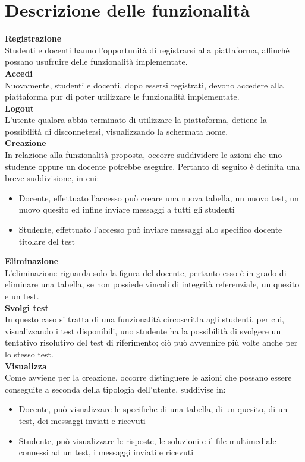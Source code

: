 \documentclass{article}
\begin{document}
\section{Descrizione delle funzionalità}
\large
\textbf{Registrazione}\\
Studenti e docenti hanno l'opportunità di registrarsi alla piattaforma, affinchè possano usufruire delle funzionalità implementate.\vspace*{7pt}\\
\textbf{Accedi}\\
Nuovamente, studenti e docenti, dopo essersi registrati, devono accedere alla piattaforma pur di poter utilizzare le funzionalità implementate.\vspace*{7pt}\\
\textbf{Logout}\\
L'utente qualora abbia terminato di utilizzare la piattaforma, detiene la possibilità di disconnetersi, visualizzando la schermata home.\vspace*{7pt}\\
\textbf{Creazione}\\
In relazione alla funzionalità proposta, occorre suddividere le azioni che uno studente oppure un docente potrebbe eseguire. Pertanto di seguito è definita una breve suddivisione, in cui: 
\begin{itemize}[label={-}]
    \itemsep0em
    \item Docente, effettuato l'accesso può creare una nuova tabella, un nuovo test, un nuovo quesito ed infine inviare messaggi a tutti gli studenti
    \item Studente, effettuato l'accesso può inviare messaggi allo specifico docente titolare del test
\end{itemize}    
\textbf{Eliminazione}\\
L'eliminazione riguarda solo la figura del docente, pertanto esso è in grado di eliminare una tabella, se non possiede vincoli di integrità referenziale, un quesito e un test.\vspace*{7pt}\\
\textbf{Svolgi test}\\
In questo caso si tratta di una funzionalità circoscritta agli studenti, per cui, visualizzando i test disponibili, uno studente ha la possibilità di svolgere un tentativo risolutivo del test di riferimento; ciò può avvennire più volte anche per lo stesso test.\vspace*{7pt}\\
\textbf{Visualizza}\\
Come avviene per la creazione, occorre distinguere le azioni che possano essere conseguite a seconda della tipologia dell'utente, suddivise in:
\begin{itemize}[label={-}]
    \itemsep0em
    \item Docente, può visualizzare le specifiche di una tabella, di un quesito, di un test, dei messaggi inviati e ricevuti
    \item Studente, può visualizzare le risposte, le soluzioni e il file multimediale connessi ad un test, i messaggi inviati e ricevuti
\end{itemize}
\end{document}
